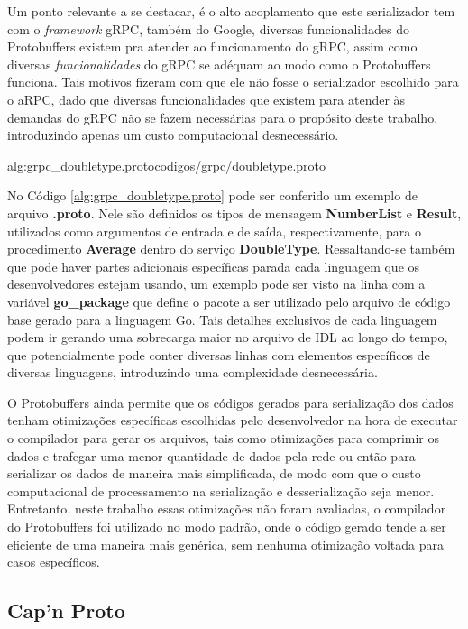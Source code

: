 Um ponto relevante a se destacar, é o alto acoplamento que este serializador tem com o \textit{framework} gRPC, também do Google, diversas funcionalidades do Protobuffers existem pra atender ao funcionamento do gRPC, assim como diversas \textit{funcionalidades} do gRPC se adéquam ao modo como o Protobuffers funciona. Tais motivos fizeram com que ele não fosse o serializador escolhido para o aRPC, dado que diversas funcionalidades que existem para atender às demandas do gRPC não se fazem necessárias para o propósito deste trabalho, introduzindo apenas um custo computacional desnecessário.

 {alg:grpc_doubletype.proto}{codigos/grpc/doubletype.proto}{}

No Código \ref{alg:grpc_doubletype.proto} pode ser conferido um exemplo de arquivo \textbf{.proto}. Nele são definidos os tipos de mensagem \textbf{NumberList} e \textbf{Result}, utilizados como argumentos de entrada e de saída, respectivamente, para o procedimento \textbf{Average} dentro do serviço \textbf{DoubleType}. Ressaltando-se também que pode haver partes adicionais específicas parada cada linguagem que os desenvolvedores estejam usando, um exemplo pode ser visto na linha com a variável \textbf{go\_package} que define o pacote a ser utilizado pelo arquivo de código base gerado para a linguagem Go. Tais detalhes exclusivos de cada linguagem podem ir gerando uma sobrecarga maior no arquivo de IDL ao longo do tempo, que potencialmente pode conter diversas linhas com elementos específicos de diversas linguagens, introduzindo uma complexidade desnecessária.

O Protobuffers ainda permite que os códigos gerados para serialização dos dados tenham otimizações específicas escolhidas pelo desenvolvedor na hora de executar o compilador para gerar os arquivos, tais como otimizações para comprimir os dados e trafegar uma menor quantidade de dados pela rede ou então para serializar os dados de maneira mais simplificada, de modo com que o custo computacional de processamento na serialização e desserialização seja menor. Entretanto, neste trabalho essas otimizações não foram avaliadas, o compilador do Protobuffers foi utilizado no modo padrão, onde o código gerado tende a ser eficiente de uma maneira mais genérica, sem nenhuma otimização voltada para casos específicos.

\subsection{Cap'n Proto}

